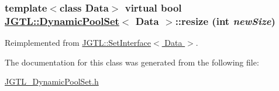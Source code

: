 \hypertarget{class_j_g_t_l_1_1_dynamic_pool_set_f9c2b0ebc042c33dca8fee5af6583446}{
\subsubsection[resize]{\setlength{\rightskip}{0pt plus 5cm}template$<$class Data$>$ virtual bool \hyperlink{class_j_g_t_l_1_1_dynamic_pool_set}{JGTL::Dynamic\-Pool\-Set}$<$ Data $>$::resize (int {\em new\-Size})}}
\label{class_j_g_t_l_1_1_dynamic_pool_set_f9c2b0ebc042c33dca8fee5af6583446}




Reimplemented from \hyperlink{class_j_g_t_l_1_1_set_interface_136d868ffd3695632c16e4f88b84352b}{JGTL::Set\-Interface$<$ Data $>$}.

The documentation for this class was generated from the following file:\begin{CompactItemize}
\item 
\hyperlink{_j_g_t_l___dynamic_pool_set_8h}{JGTL\_\-Dynamic\-Pool\-Set.h}\end{CompactItemize}
